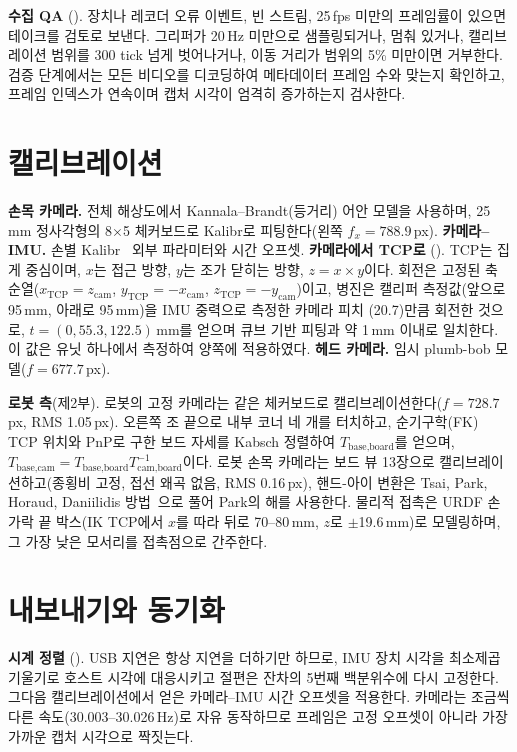\documentclass[conference,10pt]{IEEEtran}
\newcommand{\mm}{\,mm\xspace}
\begin{document}
\textbf{수집 QA} (). 장치나 레코더 오류 이벤트, 빈 스트림, 25\,fps 미만의 프레임률이 있으면 테이크를
검토로 보낸다. 그리퍼가 20\,Hz 미만으로 샘플링되거나, 멈춰 있거나, 캘리브레이션 범위를 300 tick 넘게 벗어나거나, 이동 거리가 범위의
5\% 미만이면 거부한다. 검증 단계에서는 모든 비디오를 디코딩하여 메타데이터 프레임 수와 맞는지 확인하고, 프레임 인덱스가 연속이며
캡처 시각이 엄격히 증가하는지 검사한다.

\section{캘리브레이션}\label{m:sec:cal}
\textbf{손목 카메라.} 전체 해상도에서 Kannala--Brandt(등거리) 어안 모델을 사용하며, 25\mm{} 정사각형의 8$\times$5 체커보드로
Kalibr로 피팅한다(왼쪽 $f_x{=}788.9$\,px). \textbf{카메라--IMU.} 손별 Kalibr~\cite{furgale2013kalibr} 외부 파라미터와 시간
오프셋. \textbf{카메라에서 TCP로} (). TCP는 집게 중심이며, $x$는 접근
방향, $y$는 조가 닫히는 방향, $z = x\times y$이다. 회전은 고정된 축 순열($x_\text{TCP}=z_\text{cam}$, $y_\text{TCP}=-x_\text{cam}$,
$z_\text{TCP}=-y_\text{cam}$)이고, 병진은 캘리퍼 측정값(앞으로 95\mm, 아래로 95\mm)을 IMU 중력으로 측정한 카메라 피치
(20.7\textdegree)만큼 회전한 것으로, $t=(0, 55.3, 122.5)$\mm{}를 얻으며 큐브 기반 피팅과 약 1\mm{} 이내로 일치한다. 이 값은
유닛 하나에서 측정하여 양쪽에 적용하였다. \textbf{헤드 카메라.} 임시 plumb-bob 모델($f=677.7$\,px).

\textbf{로봇 측}(제2부). 로봇의 고정 카메라는 같은 체커보드로 캘리브레이션한다($f=728.7$\,px, RMS 1.05\,px). 오른쪽 조 끝으로
내부 코너 네 개를 터치하고, 순기구학(FK) TCP 위치와 PnP로 구한 보드 자세를 Kabsch 정렬하여 $T_\text{base,board}$를 얻으며,
$T_\text{base,cam}=T_\text{base,board}T_\text{cam,board}^{-1}$이다. 로봇 손목 카메라는 보드 뷰 13장으로 캘리브레이션하고(종횡비
고정, 접선 왜곡 없음, RMS 0.16\,px), 핸드-아이 변환은 Tsai, Park, Horaud, Daniilidis 방법~\cite{tsai1989handeye}으로 풀어 Park의
해를 사용한다. 물리적 접촉은 URDF 손가락 끝 박스(IK TCP에서 $x$를 따라 뒤로 70--80\mm, $z$로 $\pm$19.6\mm)로 모델링하며, 그
가장 낮은 모서리를 접촉점으로 간주한다.

\section{내보내기와 동기화}\label{m:sec:export}
\textbf{시계 정렬} (). USB 지연은 항상 지연을 더하기만 하므로, IMU 장치 시각을 최소제곱 기울기로 호스트 시각에
대응시키고 절편은 잔차의 5번째 백분위수에 다시 고정한다. 그다음 캘리브레이션에서 얻은 카메라--IMU 시간 오프셋을 적용한다. 카메라는
조금씩 다른 속도(30.003--30.026\,Hz)로 자유 동작하므로 프레임은 고정 오프셋이 아니라 가장 가까운 캡처 시각으로 짝짓는다.
\end{document}
